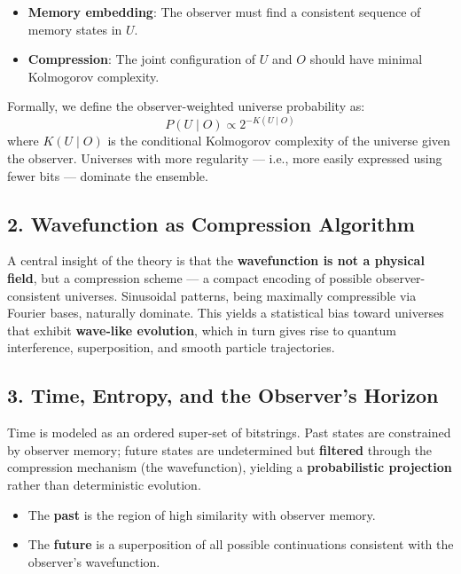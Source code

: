\documentclass[11pt]{article}
\begin{document}
\begin{itemize}
      \item \textbf{Memory embedding}: The observer must find a consistent sequence of memory states in $U$.
      \item \textbf{Compression}: The joint configuration of $U$ and $O$ should have minimal Kolmogorov complexity.
\end{itemize}

Formally, we define the observer-weighted universe probability as:
\[
      P(U \mid O) \propto 2^{-K(U \mid O)}
\]
where $K(U \mid O)$ is the conditional Kolmogorov complexity of the universe given the observer. Universes with more regularity — i.e., more easily expressed using fewer bits — dominate the ensemble.

\subsection*{2. Wavefunction as Compression Algorithm}

A central insight of the theory is that the \textbf{wavefunction is not a physical field}, but a compression scheme — a compact encoding of possible observer-consistent universes. Sinusoidal patterns, being maximally compressible via Fourier bases, naturally dominate. This yields a statistical bias toward universes that exhibit \textbf{wave-like evolution}, which in turn gives rise to quantum interference, superposition, and smooth particle trajectories.

\subsection*{3. Time, Entropy, and the Observer's Horizon}

Time is modeled as an ordered super-set of bitstrings. Past states are constrained by observer memory; future states are undetermined but \textbf{filtered} through the compression mechanism (the wavefunction), yielding a \textbf{probabilistic projection} rather than deterministic evolution.

\begin{itemize}
      \item The \textbf{past} is the region of high similarity with observer memory.
      \item The \textbf{future} is a superposition of all possible continuations consistent with the observer’s wavefunction.
\end{itemize}
\end{document}
